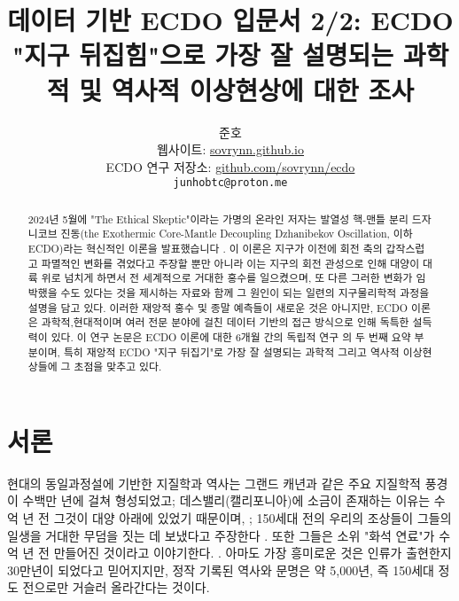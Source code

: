 \documentclass[10pt,twocolumn,letterpaper]{article}
\begin{document}
\title{데이터 기반 ECDO 입문서 2/2: ECDO "지구 뒤집힘"으로 가장 잘 설명되는 과학적 및 역사적 이상현상에 대한 조사}

\author{준호\\
웹사이트: \href{https://sovrynn.github.io}{sovrynn.github.io}\\
ECDO 연구 저장소: \href{https://github.com/sovrynn/ecdo}{github.com/sovrynn/ecdo}\\
{\tt\small junhobtc@proton.me}
}

\maketitle

\begin{abstract}
2024년 5월에 "The Ethical Skeptic"이라는 가명의 온라인 저자는 발열성 핵-맨틀 분리 드자니코브 진동(the Exothermic Core-Mantle Decoupling Dzhanibekov Oscillation, 이하 ECDO)라는 혁신적인 이론을 발표했습니다 \cite{0} \cite{1}. 이 이론은 지구가 이전에 회전 축의 갑작스럽고 파멸적인 변화를 겪었다고 주장할 뿐만 아니라 이는 지구의 회전 관성으로 인해 대양이 대륙 위로 넘치게 하면서 전 세계적으로 거대한  홍수를 일으켰으며, 또 다른 그러한 변화가 임박했을 수도 있다는 것을 제시하는 자료와 함께 그 원인이 되는 일련의 지구물리학적 과정을 설명을 담고 있다. 이러한 재앙적 홍수 및 종말 예측들이 새로운 것은 아니지만, ECDO 이론은 과학적,현대적이며 여러 전문 분야에 걸친 데이터 기반의 접근 방식으로 인해 독특한 설득력이 있다. 
이 연구 논문은 ECDO 이론에 대한 6개월 간의 독립적 연구 \cite{2,20}의 두 번째 요약 부분이며, 특히 재앙적 ECDO "지구 뒤집기"로 가장 잘 설명되는 과학적 그리고 역사적 이상현상들에 그 초점을 맞추고 있다.

\end{abstract}


\section{서론}

현대의 동일과정설에 기반한 지질학과 역사는 그랜드 캐년과 같은 주요 지질학적 풍경이 수백만 년에 걸쳐 형성되었고\cite{143}; 데스밸리(캘리포니아)에 소금이 존재하는 이유는 수억 년 전 그것이 대양 아래에 있었기 때문이며, \cite{144}; 150세대 전의 우리의 조상들이 그들의 일생을 거대한 무덤을 짓는 데 보냈다고 주장한다 \cite{29,70}. 또한 그들은 소위 "화석 연료"가 수억 년 전 만들어진 것이라고 이야기한다. \cite{104}. 아마도 가장 흥미로운 것은 인류가 출현한지 30만년이 되었다고 믿어지지만\cite{145}, 정작 기록된 역사와 문명은 약 5,000년, 즉 150세대 정도 전으로만 거슬러 올라간다는 것이다.
\end{document}
